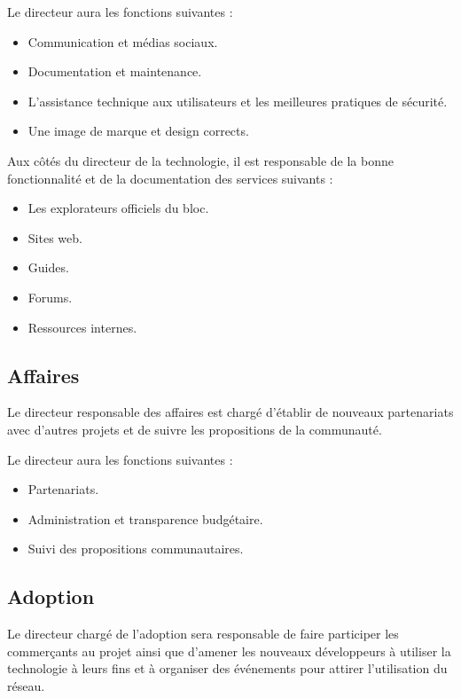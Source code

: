 \documentclass{article}
\begin{document}
Le directeur aura les fonctions suivantes :

\begin{itemize}
  \item Communication et médias sociaux.
  \item Documentation et maintenance.
  \item L'assistance technique aux utilisateurs et les meilleures pratiques de sécurité.
  \item Une image de marque et design corrects.
\end{itemize}

Aux côtés du directeur de la technologie, il est responsable de la bonne fonctionnalité et de la documentation des services suivants :

\begin{itemize}
  \item Les explorateurs officiels du bloc.
  \item Sites web.
  \item Guides.
  \item Forums.
  \item Ressources internes.
\end{itemize}


\subsection{Affaires}

Le directeur responsable des affaires est chargé d'établir de nouveaux partenariats avec d'autres projets et de suivre les propositions de la communauté.

Le directeur aura les fonctions suivantes :

\begin{itemize}
  \item Partenariats.
  \item Administration et transparence budgétaire.
  \item Suivi des propositions communautaires.
\end{itemize}

\subsection{Adoption}

Le directeur chargé de l'adoption sera responsable de faire participer les commerçants au projet ainsi que d'amener les nouveaux développeurs à utiliser la technologie à leurs fins et à organiser des événements pour attirer l'utilisation du réseau.
\end{document}
